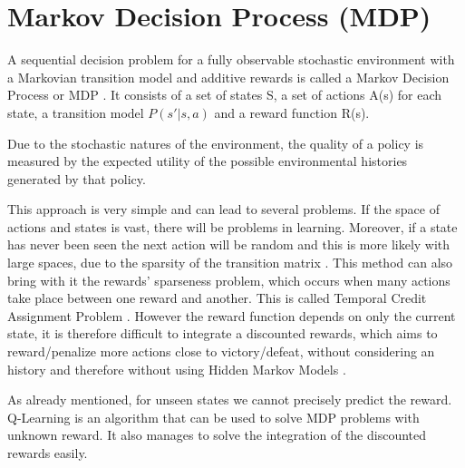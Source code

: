 \section{Markov Decision Process (MDP)}
\label{sec:mdp}
A sequential decision problem for a fully observable stochastic environment with a 
Markovian transition model and additive rewards is called a 
Markov Decision Process or MDP \cite{russell2002artificial}.
It consists of a set of states S, a set of actions A(s) for each state, a transition model
$P(s' | s, a)$ and a reward function R(s).

Due to the stochastic natures of the environment, the quality of a policy is measured by the expected utility of the possible environmental histories generated by that policy.

This approach is very simple and can lead to several problems.
If the space of actions and states is vast, there will be problems in learning.
Moreover, if a state has never been seen the next action will be random and this is more
likely with large spaces, due to the sparsity of the transition matrix \cite{silver2015}.
This method can also bring with it the rewards' sparseness problem, which occurs when many
actions take place between one reward and another. This is called Temporal Credit Assignment Problem \cite{sutton1984temporal}.
However the reward function depends on only the current state, it is
therefore difficult to integrate a discounted rewards, which aims to reward/penalize
more actions close to victory/defeat, without considering an history and therefore
without using Hidden Markov Models \cite{silver2015}.

As already mentioned, for unseen states we cannot precisely predict the reward.
Q-Learning is an algorithm that can be used to solve MDP problems with unknown reward.
It also manages to solve the integration of the discounted rewards easily.

\pagebreak
